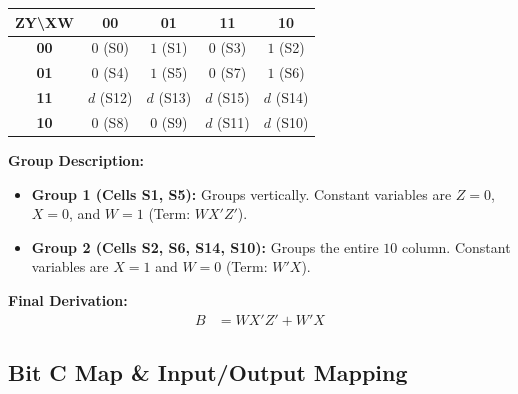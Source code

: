 \documentclass[journal,12pt,onecolumn]{IEEEtran}
\begin{document}
		\begin{table}[H]
			\centering
			\begin{tabular}{|c|c|c|c|c|}
				\hline
				\textbf{ZY\textbackslash XW} & \textbf{00} & \textbf{01} & \textbf{11} & \textbf{10} \\
				\hline
				\textbf{00} & $0$ (S0) & \cellcolor{grpRed}$1$ (S1) & $0$ (S3) & \cellcolor{grpGreen}$1$ (S2) \\
				\hline
				\textbf{01} & $0$ (S4) & \cellcolor{grpRed}$1$ (S5) & $0$ (S7) & \cellcolor{grpGreen}$1$ (S6) \\
				\hline
				\textbf{11} & $d$ (S12) & $d$ (S13) & $d$ (S15) & \cellcolor{grpGreen}$d$ (S14) \\
				\hline
				\textbf{10} & $0$ (S8) & $0$ (S9) & $d$ (S11) & \cellcolor{grpGreen}$d$ (S10) \\
				\hline
			\end{tabular}
		\end{table}
		
		\begin{justify}
			\textbf{Group Description:} 
			\begin{itemize}
				\item \textbf{Group 1 (Cells S1, S5):} Groups vertically. Constant variables are $Z=0$, $X=0$, and $W=1$ (Term: $WX'Z'$).
				\item \textbf{Group 2 (Cells S2, S6, S14, S10):} Groups the entire $10$ column. Constant variables are $X=1$ and $W=0$ (Term: $W'X$).
			\end{itemize}
			
			\textbf{Final Derivation:}
			\begin{align}
				B &= WX'Z' + W'X
			\end{align}
		\end{justify}
		
		\vspace{1em}
		\subsection{Bit C Map \& Input/Output Mapping}
		
\end{document}
